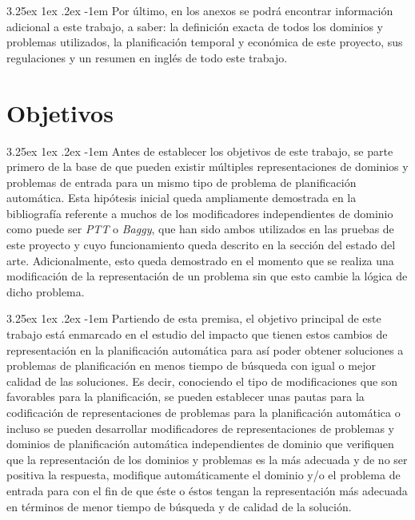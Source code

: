 \documentclass{article}
\makeatletter
\renewcommand\paragraph{\@startsection{paragraph}{5}{\z@}%
      {3.25ex \@plus1ex \@minus.2ex}%
      {-1em}%
      {\normalfont\normalsize\bfseries}}
\makeatother
\begin{document}
    \paragraph{}
    Por último, en los anexos se podrá encontrar información adicional a este trabajo, a saber: la definición exacta de todos los dominios y problemas utilizados, la planificación temporal y económica de este proyecto, sus regulaciones y un resumen en inglés de todo este trabajo.
    
    \pagebreak
    
    \section{Objetivos}
    \paragraph{}
    Antes de establecer los objetivos de este trabajo, se parte primero de la base de que pueden existir múltiples representaciones de dominios y problemas de entrada para un mismo tipo de problema de planificación automática. Esta hipótesis inicial queda ampliamente demostrada en la bibliografía referente a muchos de los modificadores independientes de dominio como puede ser \textit{PTT} o \textit{Baggy}, que han sido ambos utilizados en las pruebas de este proyecto y cuyo funcionamiento queda descrito en la sección del estado del arte. Adicionalmente, esto queda demostrado en el momento que se realiza una modificación de la representación de un problema sin que esto cambie la lógica de dicho problema.
    
    \paragraph{}
    Partiendo de esta premisa, el objetivo principal de este trabajo está enmarcado en el estudio del impacto que tienen estos cambios de representación en la planificación automática para así poder obtener soluciones a problemas de planificación en menos tiempo de búsqueda con igual o mejor calidad de las soluciones. Es decir, conociendo el tipo de modificaciones que son favorables para la planificación, se pueden establecer unas pautas para la codificación de representaciones de problemas para la planificación automática o incluso se pueden desarrollar modificadores de representaciones de problemas y dominios de planificación automática independientes de dominio que verifiquen que la representación de los dominios y problemas es la más adecuada y de no ser positiva la respuesta, modifique automáticamente el dominio y/o el problema de entrada para con el fin de que éste o éstos tengan la representación más adecuada en términos de menor tiempo de búsqueda y de calidad de la solución.
    
\end{document}
